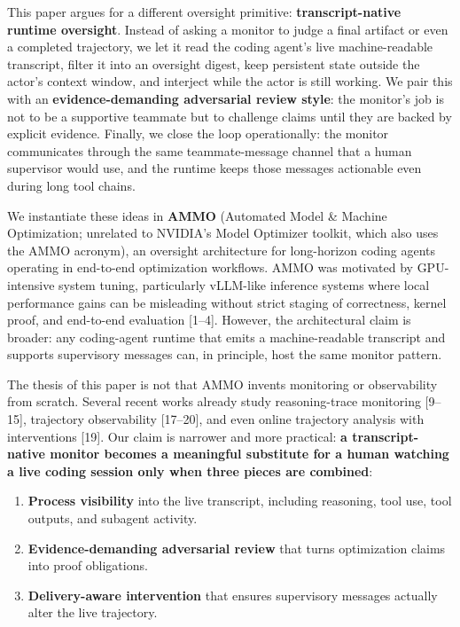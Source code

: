 \documentclass[11pt]{article}
\begin{document}
This paper argues for a different oversight primitive: \textbf{transcript-native runtime oversight}. Instead of asking a monitor to judge a final artifact or even a completed trajectory, we let it read the coding agent's live machine-readable transcript, filter it into an oversight digest, keep persistent state outside the actor's context window, and interject while the actor is still working. We pair this with an \textbf{evidence-demanding adversarial review style}: the monitor's job is not to be a supportive teammate but to challenge claims until they are backed by explicit evidence. Finally, we close the loop operationally: the monitor communicates through the same teammate-message channel that a human supervisor would use, and the runtime keeps those messages actionable even during long tool chains.

We instantiate these ideas in \textbf{AMMO} (Automated Model \& Machine Optimization; unrelated to NVIDIA's Model Optimizer toolkit, which also uses the AMMO acronym), an oversight architecture for long-horizon coding agents operating in end-to-end optimization workflows. AMMO was motivated by GPU-intensive system tuning, particularly vLLM-like inference systems where local performance gains can be misleading without strict staging of correctness, kernel proof, and end-to-end evaluation [1--4]. However, the architectural claim is broader: any coding-agent runtime that emits a machine-readable transcript and supports supervisory messages can, in principle, host the same monitor pattern.

The thesis of this paper is not that AMMO invents monitoring or observability from scratch. Several recent works already study reasoning-trace monitoring [9--15], trajectory observability [17--20], and even online trajectory analysis with interventions [19]. Our claim is narrower and more practical: \textbf{a transcript-native monitor becomes a meaningful substitute for a human watching a live coding session only when three pieces are combined}:

\begin{enumerate}[leftmargin=*,itemsep=2pt]
  \item \textbf{Process visibility} into the live transcript, including reasoning, tool use, tool outputs, and subagent activity.
  \item \textbf{Evidence-demanding adversarial review} that turns optimization claims into proof obligations.
  \item \textbf{Delivery-aware intervention} that ensures supervisory messages actually alter the live trajectory.
\end{enumerate}
\end{document}
